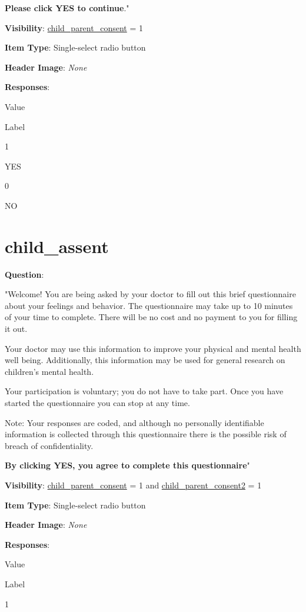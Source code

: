 \documentclass[]{book}
\begin{document}
\textbf{Please click YES to continue}."

\textbf{Visibility}: \protect\hyperlink{child_parent_consent}{child\_parent\_consent} = 1

\textbf{Item Type}: Single-select radio button

\textbf{Header Image}: \emph{None}

\textbf{Responses}:

Value

Label

1

YES

0

NO

\hypertarget{child_assent}{%
\section{child\_assent}\label{child_assent}}

\textbf{Question}:

"Welcome! You are being asked by your doctor to fill out this brief questionnaire about your feelings and behavior. The questionnaire may take up to 10 minutes of your time to complete. There will be no cost and no payment to you for filling it out.

Your doctor may use this information to improve your physical and mental health well being. Additionally, this information may be used for general research on children's mental health.

Your participation is voluntary; you do not have to take part. Once you have started the questionnaire you can stop at any time.

Note: Your responses are coded, and although no personally identifiable information is collected through this questionnaire there is the possible risk of breach of confidentiality.

\textbf{By clicking YES, you agree to complete this questionnaire}"

\textbf{Visibility}: \protect\hyperlink{child_parent_consent}{child\_parent\_consent} = 1 and \protect\hyperlink{child_parent_consent2}{child\_parent\_consent2} = 1

\textbf{Item Type}: Single-select radio button

\textbf{Header Image}: \emph{None}

\textbf{Responses}:

Value

Label

1
\end{document}
